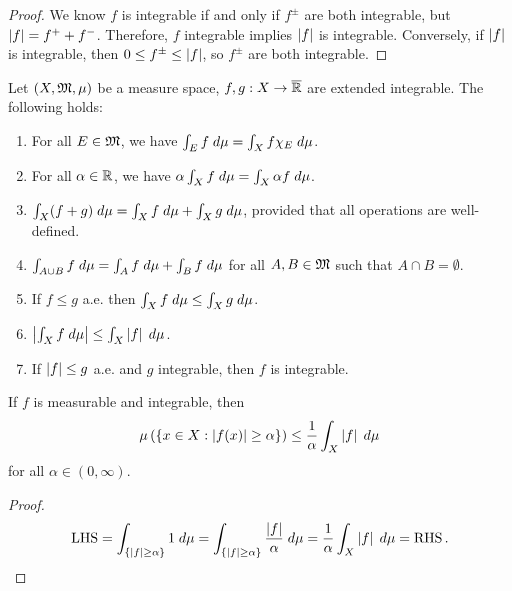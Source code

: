 \documentclass[a4paper]{article}
\begin{document}
\begin{proof}
We know $f$ is integrable if and only if $f^\pm$
are both integrable, but $\left\lvert f\right\rvert = f^+ + f^-$.
Therefore, $f$ integrable implies $\left\lvert f\right\rvert$ is integrable.
Conversely, if $\left\lvert f\right\rvert$ is integrable, then 
$0 \leq f^\pm \leq \left\lvert f\right\rvert$, so $f^\pm$ are both 
integrable.
\end{proof}

\begin{thm}
Let $(X, \mathfrak{M}, \mu)$ be a measure space, 
$f, g : X \to \overline{\mathbb{R}}$ are extended integrable. 
The following holds: 
\begin{enumerate}
  \item For all $E \in \mathfrak{M}$, we have $\int_E f \; d \mu
  = \int_X f \chi_E \; d \mu$. 
  
  \item For all $\alpha \in \mathbb{R}$, we have 
  $\alpha \int_X f \; d \mu = \int_X \alpha f \; d \mu$. 
  
  \item $\int_X (f + g) \; d \mu = \int_X f \; d \mu + 
  \int_X g \; d \mu$, provided that all operations are 
  well-defined.

  \item $\int_{A \cup B} f \; d \mu = \int_A f \; d \mu 
  + \int_B f \; d \mu$ for all $A, B \in \mathfrak{M}$ such that 
  $A \cap B = \emptyset$. 

  \item If $f \leq g$ a.e. then $\int_X f \; d \mu \leq
  \int_X g \; d \mu$.

  \item $\left\lvert \int_X f \; d \mu\right\rvert \leq \int_X \left\lvert f\right\rvert \; d \mu$.
  
  \item If $\left\lvert f\right\rvert \leq g$ a.e. and $g$ integrable, then 
  $f$ is integrable. 
\end{enumerate}
\end{thm}

\begin{thm}
If $f$ is measurable and integrable, then 
\[
\mu \left( \left\{ x \in X : \left\lvert f(x)\right\rvert \geq \alpha \right\} \right) 
\leq \frac{1}{\alpha} \int_X \left\lvert f\right\rvert \; d \mu
\]
for all $\alpha \in (0, \infty)$.
\end{thm}

\begin{proof}
\[
\begin{aligned}
  \operatorname{LHS} = \int_{\left\{ \left\lvert f\right\rvert \geq \alpha \right\}} 1 \; d \mu 
  = \int_{\left\{ \left\lvert f\right\rvert \geq \alpha \right\}} 
  \frac{\left\lvert f\right\rvert}{\alpha} \; d \mu 
  = \frac{1}{\alpha} \int_X \left\lvert f\right\rvert \; d \mu 
  = \operatorname{RHS}.
\end{aligned}
\]
\end{proof}
\end{document}
